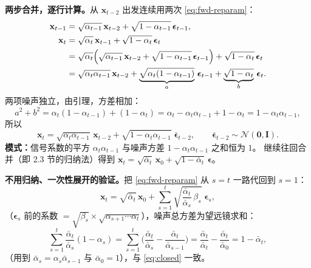 \documentclass[a4paper,fontset=none,zihao=5]{ctexart}
\numberwithin{equation}{section}
\newcommand{\x}{\mathbf{x}}
\newcommand{\I}{\mathbf{I}}
\newcommand{\N}{\mathcal{N}}
\newcommand{\abar}{\bar{\alpha}}
\newcommand{\eps}{\boldsymbol{\epsilon}}
\begin{document}
\textbf{两步合并，逐行计算。}从 $\x_{t-2}$ 出发连续用两次 \eqref{eq:fwd-reparam}：
\begin{align}
  \x_{t-1} &= \sqrt{\alpha_{t-1}}\,\x_{t-2}+\sqrt{1-\alpha_{t-1}}\,\eps_{t-1}, \notag\\
  \x_t &= \sqrt{\alpha_t}\,\x_{t-1}+\sqrt{1-\alpha_t}\,\eps_t \notag\\
       &= \sqrt{\alpha_t}\Big(\sqrt{\alpha_{t-1}}\,\x_{t-2}+\sqrt{1-\alpha_{t-1}}\,\eps_{t-1}\Big)+\sqrt{1-\alpha_t}\,\eps_t \notag\\
       &= \sqrt{\alpha_t\alpha_{t-1}}\,\x_{t-2}
          +\underbrace{\sqrt{\alpha_t(1-\alpha_{t-1})}}_{a}\,\eps_{t-1}
          +\underbrace{\sqrt{1-\alpha_t}}_{b}\,\eps_t . \label{eq:two-step}
\end{align}
两项噪声独立，由引理，方差相加：
\begin{equation}
  a^2+b^2=\alpha_t(1-\alpha_{t-1})+(1-\alpha_t)=\alpha_t-\alpha_t\alpha_{t-1}+1-\alpha_t=1-\alpha_t\alpha_{t-1},
\end{equation}
所以
\begin{equation}
  \x_t=\sqrt{\alpha_t\alpha_{t-1}}\,\x_{t-2}+\sqrt{1-\alpha_t\alpha_{t-1}}\;\bar{\eps}_{t-2},\qquad\bar{\eps}_{t-2}\sim\N(\mathbf{0},\I).
\end{equation}
\textbf{模式：}信号系数的平方 $\alpha_t\alpha_{t-1}$ 与噪声方差 $1-\alpha_t\alpha_{t-1}$ 之和恒为 $1$。
继续往回合并（即 2.3 节的归纳法）得到 $\x_t=\sqrt{\abar_t}\,\x_0+\sqrt{1-\abar_t}\,\eps$。

\textbf{不用归纳、一次性展开的验证。}把 \eqref{eq:fwd-reparam} 从 $s=t$ 一路代回到 $s=1$：
\begin{equation}
  \x_t=\sqrt{\abar_t}\,\x_0+\sum_{s=1}^{t}\sqrt{\frac{\abar_t}{\abar_s}\,\beta_s}\;\eps_s ,
\end{equation}
（$\eps_s$ 前的系数 $=\sqrt{\beta_s}\times\sqrt{\alpha_{s+1}\cdots\alpha_t}$），噪声总方差为望远镜求和：
\begin{equation}
  \sum_{s=1}^{t}\frac{\abar_t}{\abar_s}(1-\alpha_s)
  =\sum_{s=1}^{t}\Big(\frac{\abar_t}{\abar_s}-\frac{\abar_t}{\abar_{s-1}}\Big)
  =\frac{\abar_t}{\abar_t}-\frac{\abar_t}{\abar_0}=1-\abar_t ,
\end{equation}
（用到 $\abar_s=\alpha_s\abar_{s-1}$ 与 $\abar_0=1$），与 \eqref{eq:closed} 一致。
\end{document}
